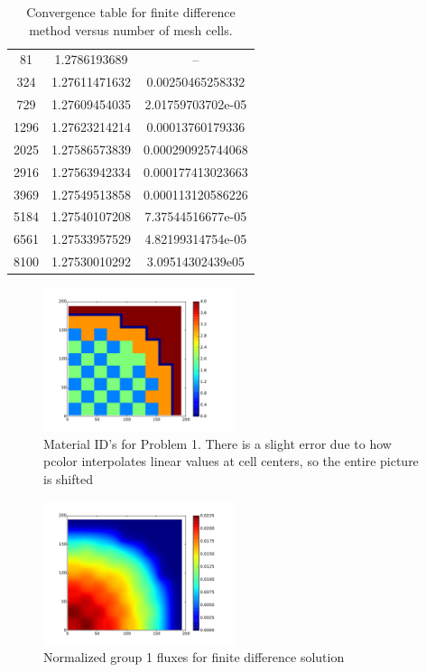 \documentclass[12pt]{article}
\newenvironment{solnum}[2][Solution]{\begin{trivlist}
\item[\hskip \labelsep {\bfseries #1}\hskip \labelsep {\bfseries #2:}]\hspace{0.3in}\newline\newline}{\end{trivlist}}
\begin{document}
\begin{solnum}{1-1}
\begin{table}
    \centering
    \caption{Convergence table for finite difference method versus number of mesh
    cells.}
\begin{tabular}{ccc} \hline
81   & 1.2786193689  &  -- \\ 
324       & 1.27611471632   & 0.00250465258332 \\
729       & 1.27609454035   & 2.01759703702e-05 \\
1296      & 1.27623214214   & 0.00013760179336  \\ 
2025 & 1.27586573839 & 0.000290925744068  \\
2916 & 1.27563942334 & 0.000177413023663  \\
3969 & 1.27549513858 & 0.000113120586226  \\
5184 & 1.27540107208 & 7.37544516677e-05  \\
6561 & 1.27533957529 & 4.82199314754e-05  \\ \hline
8100 & 1.27530010292 & 3.09514302439e05   \\ \hline
    \end{tabular}
\end{table}

\begin{figure}
    \centering
    \caption{Material ID's for Problem 1. There is a slight error due to how pcolor
    interpolates linear values at cell centers, so the entire picture is shifted}
    \includegraphics[width=0.5\textwidth]{geometry.pdf}
\end{figure}

\begin{figure}
    \centering
    \caption{Normalized group 1 fluxes for finite difference solution}
    \includegraphics[width=0.5\textwidth]{prob1_diff_g1.pdf}
\end{figure}


\end{solnum}
\end{document}
